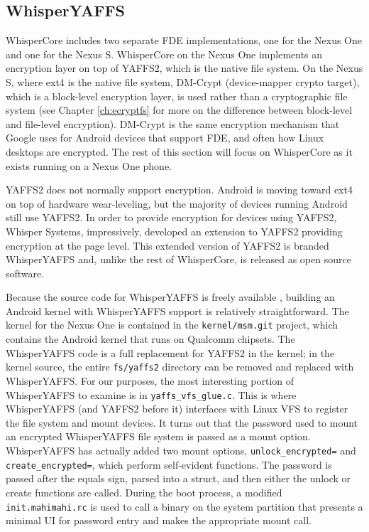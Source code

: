 \subsection{WhisperYAFFS}
WhisperCore includes two separate FDE implementations, one for the Nexus One and one for the Nexus S. WhisperCore on the Nexus
One implements an encryption layer on top of YAFFS2, which is the native file system.  On the Nexus S, where ext4 is the native
file system, DM-Crypt (device-mapper crypto target), which is a block-level encryption layer, is used rather than a cryptographic
file system (see Chapter \ref{ch:ecryptfs} for more on the difference between block-level and file-level encryption).  DM-Crypt is the
same encryption mechanism that Google uses for Android devices that support FDE, and often how Linux desktops are encrypted.  The
rest of this section will focus on WhisperCore as it exists running on a Nexus One phone.

YAFFS2 does not normally support encryption.  Android is moving toward ext4 on top of hardware wear-leveling, but the majority of
devices running Android still use YAFFS2.  In order to provide encryption for devices using YAFFS2, Whisper Systems, impressively,
developed an extension to YAFFS2 providing encryption at the page level.  This extended version of YAFFS2 is branded WhisperYAFFS
and, unlike the rest of WhisperCore, is released as open source software.

Because the source code for WhisperYAFFS is freely available \cite{whisperyaffs}, building an Android kernel with WhisperYAFFS
support is relatively straightforward. The kernel for the Nexus One is contained in the \texttt{kernel/msm.git} project, which contains the
Android kernel that runs on Qualcomm chipsets.  The WhisperYAFFS code is a full replacement for YAFFS2 in the kernel; in the kernel
source, the entire \texttt{fs/yaffs2} directory can be removed and replaced with WhisperYAFFS.  For our purposes, the most
interesting portion of WhisperYAFFS to examine is in \texttt{yaffs\_vfs\_glue.c}.  This is where WhisperYAFFS (and YAFFS2 before it)
interfaces with Linux VFS to register the file system and mount devices.  It turns out that the password used to mount an encrypted
WhisperYAFFS file system is passed as a mount option.  WhisperYAFFS has actually added two mount options, \texttt{unlock\_encrypted=}
and \texttt{create\_encrypted=}, which perform self-evident functions.  The password is passed after the equals sign, parsed into a
struct, and then either the unlock or create functions are called.  During the boot process, a modified \texttt{init.mahimahi.rc} is
used to call a binary on the system partition that presents a minimal UI for password entry and makes the appropriate mount call. 

